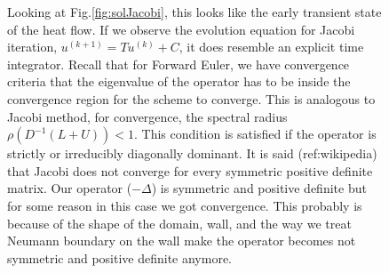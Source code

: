 \documentclass[11pt, letterpaper, hidelinks]{article}
\theoremstyle{definition}
\begin{document}
\begin{figure}[H]
Looking at Fig.\ref{fig:solJacobi}, this looks like the early transient state of the heat flow. If we observe the evolution equation for Jacobi iteration, $u^{(k+1)} = Tu^{(k)} + C$, it does resemble an explicit time integrator. Recall that for Forward Euler, we have convergence criteria that the eigenvalue of the operator has to be inside the convergence region for the scheme to converge. This is analogous to Jacobi method, for convergence, the spectral radius $\rho \left(D^{-1}(L+U)\right)<1$. This condition is satisfied if the operator is strictly or irreducibly diagonally dominant. It is said (ref:wikipedia) that Jacobi does not converge for every symmetric positive definite matrix. Our operator ($-\Delta$) is symmetric and positive definite but for some reason in this case we got convergence. This probably is because of the shape of the domain, wall, and the way we treat Neumann boundary on the wall make the operator becomes not symmetric and positive definite anymore.


\end{figure}
\end{document}
